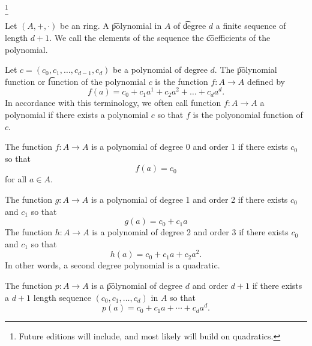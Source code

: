 

\footnote{Future editions will include, and most likely will build on quadratics.}


Let $(A, +, \cdot)$ be an ring.
A \t{polynomial} in $A$ of \t{degree} $d$ a finite sequence of length $d+1$.
We call the elements of the sequence the \t{coefficients} of the polynomial.

Let $c = (c_0, c_1, \dots, c_{d-1}, c_d)$ be a polynomial of degree $d$.
The \t{polynomial function} or \t{function of the polynomial} $c$ is the function $f: A \to A$ defined by
\[
  f(a) = c_0 + c_1a^1 + c_2a^2 + \dots + c_da^d.
\]
In accordance with this terminology, we often call  function $f: A \to A$ a polynomial if there exists a polynomial $c$ so that $f$ is the polyonomial function of $c$.

The function $f: A \to A$ is a polynomial of degree 0 and order 1 if there exists $c_0$ so that
\[
  f(a) = c_0
\]
for all $a \in A$.

The function $g: A \to A$ is a polynomial of degree 1 and order 2 if there exists $c_0$ and $c_1$ so that
\[
  g(a) = c_0 + c_1a
\]
The function $h: A \to A$ is a polynomial of degree 2 and order 3 if there exists $c_0$ and $c_1$ so that
\[
  h(a) = c_0 + c_1a + c_2a^2.
\]
In other words, a second degree polynomial is a quadratic.

The function $p: A \to A$ is a \t{polynomial} of degree $d$ and order $d+1$ if there exists a $d+1$ length sequence $(c_0, c_1, \dots, c_d)$ in $A$ so that
\[
  p(a) = c_0 + c_1a + \cdots + c_da^d.
\]

